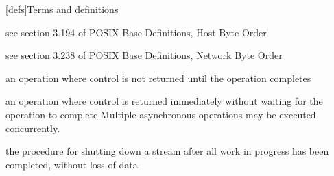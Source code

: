 
[defs]{Terms and definitions}

\setcounter{section}{1}
\setcounter{tocdepth}{0}

see section 3.194 of POSIX Base Definitions, Host Byte Order

see section 3.238 of POSIX Base Definitions, Network Byte Order

an operation where control is not returned until the operation completes

an operation where control is returned immediately without waiting for the operation to complete
\enternote Multiple asynchronous operations may be executed concurrently. \exitnote

the procedure for shutting down a stream after all work in progress has been completed, without loss of data

\setcounter{tocdepth}{1}
